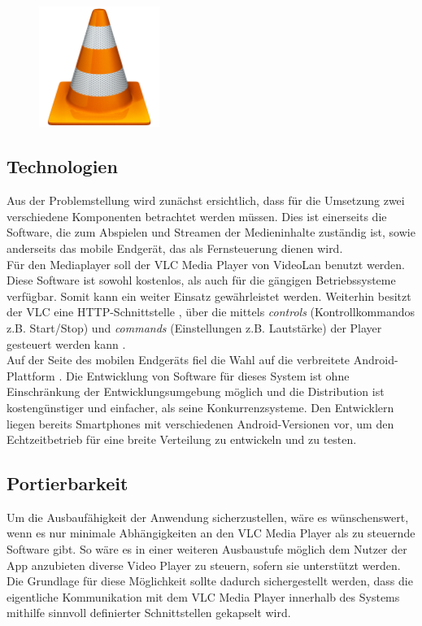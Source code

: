 \documentclass[a4paper,12pt]{article}
\begin{document}
\begin{figure}[H]
\centering
\includegraphics[width=0.35\textwidth]{vlc.png}
\end{figure}
\newpage

\subsection{Technologien}
Aus der Problemstellung wird zunächst ersichtlich, dass für die Umsetzung zwei verschiedene Komponenten betrachtet werden müssen. Dies ist einerseits die Software, die zum Abspielen und Streamen der Medieninhalte zuständig ist, sowie anderseits das mobile Endgerät, das als Fernsteuerung dienen wird. \\
Für den Mediaplayer soll der VLC Media Player von VideoLan \cite{VLC} benutzt werden. Diese Software ist sowohl kostenlos, als auch für die gängigen Betriebssysteme verfügbar. Somit kann ein weiter Einsatz gewährleistet werden. Weiterhin besitzt der VLC eine HTTP-Schnittstelle \cite{VLC:WebInterface}, über die mittels \textit{controls} (Kontrollkommandos z.B. Start/Stop) und \textit{commands} (Einstellungen z.B. Lautstärke) der Player gesteuert werden kann \cite{VLC:HowTo}. \\
Auf der Seite des mobilen Endgeräts fiel die Wahl auf die verbreitete Android-Plattform \cite{Android}. Die Entwicklung von Software für dieses System ist ohne Einschränkung der Entwicklungsumgebung möglich und die Distribution ist kostengünstiger und einfacher, als seine Konkurrenzsysteme. Den Entwicklern liegen bereits Smartphones mit verschiedenen Android-Versionen vor, um den Echtzeitbetrieb für eine breite Verteilung zu entwickeln und zu testen.

\subsection{Portierbarkeit}
Um die Ausbaufähigkeit der Anwendung sicherzustellen, wäre es wünschenswert, wenn es nur minimale Abhängigkeiten an den VLC Media Player als zu steuernde Software gibt. So wäre es in einer weiteren Ausbaustufe möglich dem Nutzer der App anzubieten diverse Video Player zu steuern, sofern sie unterstützt werden. Die Grundlage für diese Möglichkeit sollte dadurch sichergestellt werden, dass die eigentliche Kommunikation mit dem VLC Media Player innerhalb des Systems mithilfe sinnvoll definierter Schnittstellen gekapselt wird.
\end{document}
